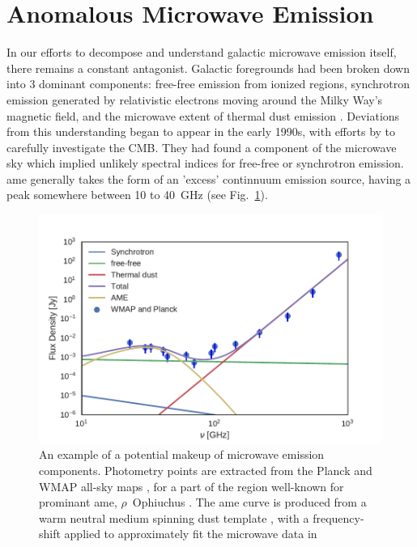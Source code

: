   \section{Anomalous Microwave Emission}
      In our efforts to decompose and understand galactic microwave emission itself, there remains a constant antagonist. Galactic foregrounds had been broken down into 3 dominant components: free-free emission from ionized regions, synchrotron emission generated by relativistic electrons moving around the Milky Way's magnetic field, and the microwave extent of thermal dust emission \citep{wmap03b, leach08, planckXII}. Deviations from this understanding began to appear in the early 1990s, with efforts by \cite{kogut96, leitch97} to carefully investigate the CMB. They had found a component of the microwave sky which implied unlikely spectral indices for free-free or synchrotron emission. \gls{ame} generally takes the form of an 'excess' continnuum emission source, having a peak somewhere between 10 to 40~GHz (see Fig.~\ref{fig:mw_foregrounds_demo_rOph}).
            \begin{figure}
              \centering
              \includegraphics[width=\textwidth]{../Plots/ch_intro/mw_foregrounds_demo_rOph_sub_Jy5.pdf}
                \caption{An example of a potential makeup of microwave emission components. Photometry points are extracted from the Planck and WMAP all-sky maps \citep{hfi14viii}, for a part of the region well-known for prominant \gls{ame}, $\rho$~Ophiuchus \citep{planckxx11}. The \gls{ame} curve is produced from a warm neutral medium spinning dust template \citep{ali-haimoud09}, with a frequency-shift applied to approximately fit the microwave data in \cite{planck15X}}
              \label{fig:mw_foregrounds_demo_rOph}
            \end{figure}
